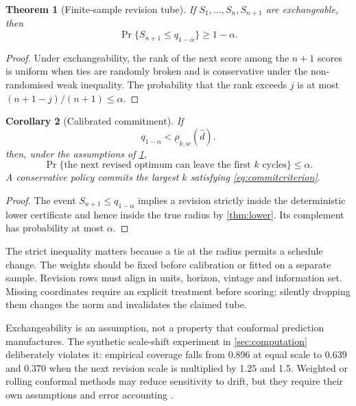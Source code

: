 \documentclass[11pt]{article}
\newtheorem{theorem}{Theorem}[section]
\newtheorem{corollary}[theorem]{Corollary}
\theoremstyle{definition}
\newcommand{\dhat}{\widehat d}
\begin{document}
\begin{theorem}[Finite-sample revision tube]\label{thm:conformal}
If $S_1,\ldots,S_n,S_{n+1}$ are exchangeable, then
\begin{equation}\label{eq:coverage}
\Pr\{S_{n+1}\le q_{1-\alpha}\}\ge1-\alpha.
\end{equation}
\end{theorem}

\begin{proof}
Under exchangeability, the rank of the next score among the $n+1$ scores is uniform when ties are randomly broken and is conservative under the non-randomised weak inequality. The probability that the rank exceeds $j$ is at most $(n+1-j)/(n+1)\le\alpha$.
\end{proof}

\begin{corollary}[Calibrated commitment]\label{cor:calibrated}
If
\begin{equation}\label{eq:commitcriterion}
q_{1-\alpha}<\underline\rho_{k,w}(\dhat).
\end{equation}
then, under the assumptions of \cref{thm:conformal},
\[
\Pr\{\text{the next revised optimum can leave the first $k$ cycles}\}\le\alpha.
\]
A conservative policy commits the largest $k$ satisfying \eqref{eq:commitcriterion}.
\end{corollary}

\begin{proof}
The event $S_{n+1}\le q_{1-\alpha}$ implies a revision strictly inside the deterministic lower certificate and hence inside the true radius by \cref{thm:lower}. Its complement has probability at most $\alpha$.
\end{proof}

The strict inequality matters because a tie at the radius permits a schedule change. The weights should be fixed before calibration or fitted on a separate sample. Revision rows must align in units, horizon, vintage and information set. Missing coordinates require an explicit treatment before scoring; silently dropping them changes the norm and invalidates the claimed tube.

Exchangeability is an assumption, not a property that conformal prediction manufactures. The synthetic scale-shift experiment in \cref{sec:computation} deliberately violates it: empirical coverage falls from 0.896 at equal scale to 0.639 and 0.370 when the next revision scale is multiplied by 1.25 and 1.5. Weighted or rolling conformal methods may reduce sensitivity to drift, but they require their own assumptions and error accounting \parencite{BarberEtAl2023}.
\end{document}
